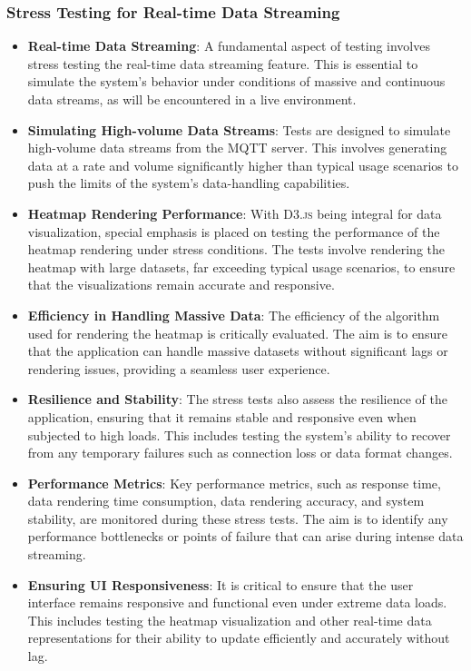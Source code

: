 \subsubsection{Stress Testing for Real-time Data Streaming}
\begin{itemize}
  \item \textbf{Real-time Data Streaming}: A fundamental aspect of testing involves stress testing the real-time data streaming feature. This is essential to simulate the system's behavior under conditions of massive and continuous data streams, as will be encountered in a live environment.
  \item \textbf{Simulating High-volume Data Streams}: Tests are designed to simulate high-volume data streams from the MQTT server. This involves generating data at a rate and volume significantly higher than typical usage scenarios to push the limits of the system's data-handling capabilities.
  \item \textbf{Heatmap Rendering Performance}: With \textsc{D3.js} being integral for data visualization, special emphasis is placed on testing the performance of the heatmap rendering under stress conditions. The tests involve rendering the heatmap with large datasets, far exceeding typical usage scenarios, to ensure that the visualizations remain accurate and responsive.
  \item \textbf{Efficiency in Handling Massive Data}: The efficiency of the algorithm used for rendering the heatmap is critically evaluated. The aim is to ensure that the application can handle massive datasets without significant lags or rendering issues, providing a seamless user experience.
  \item \textbf{Resilience and Stability}: The stress tests also assess the resilience of the application, ensuring that it remains stable and responsive even when subjected to high loads. This includes testing the system's ability to recover from any temporary failures such as connection loss or data format changes.
  \item \textbf{Performance Metrics}: Key performance metrics, such as response time, data rendering time consumption, data rendering accuracy, and system stability, are monitored during these stress tests. The aim is to identify any performance bottlenecks or points of failure that can arise during intense data streaming.
  \item \textbf{Ensuring UI Responsiveness}: It is critical to ensure that the user interface remains responsive and functional even under extreme data loads. This includes testing the heatmap visualization and other real-time data representations for their ability to update efficiently and accurately without lag.
\end{itemize}

